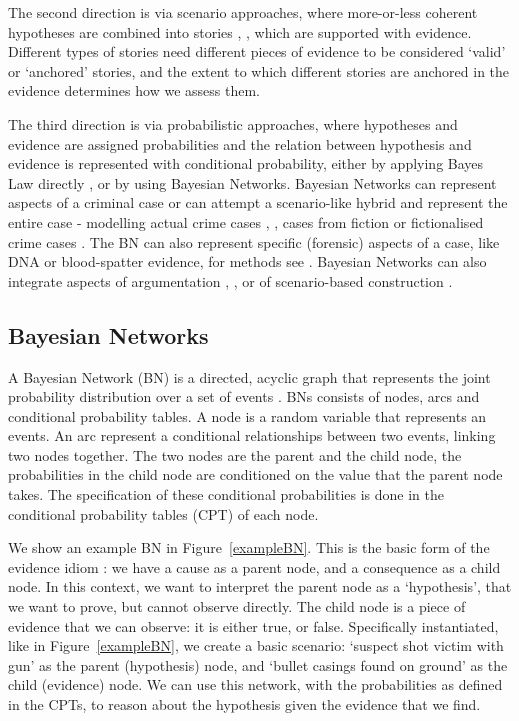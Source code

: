 \documentclass[11pt]{article}
\begin{document}
The second direction is via scenario approaches, where more-or-less coherent hypotheses are combined into stories \citep{penningtonHastie1993}, \citep{wagenaar1993}, which are supported with evidence. Different types of stories need different pieces of evidence to be considered `valid' or `anchored' stories, and the extent to which different stories are anchored in the evidence determines how we assess them. 

The third direction is via probabilistic approaches, where hypotheses and evidence are assigned probabilities and the relation between hypothesis and evidence is represented with conditional probability, either by applying Bayes Law directly \citep{dahlman2020}, or by using Bayesian Networks. Bayesian Networks can represent aspects of a criminal case or can attempt a scenario-like hybrid and represent the entire case - modelling actual crime cases \citep{kadaneSchum1996}, \citep{Fenton2019},  cases from fiction \citep{Fenton2012} or fictionalised crime cases \citep{vanLeeuwen2019}. The BN can also represent specific (forensic) aspects of a case, like DNA or blood-spatter evidence, for methods see \citep{Meester2021}. Bayesian Networks can also integrate aspects of argumentation \citep{wieten2019}, \citep{timmer2016}, or of scenario-based construction \citep{vlek2016}.



\subsection{Bayesian Networks}

A Bayesian Network (BN) is a directed, acyclic graph that represents the joint probability distribution over a set of events \citep{pearl1988b}. BNs consists of nodes, arcs and conditional probability tables. A node is a random variable that represents an events. An arc represent a conditional relationships between two events, linking two nodes together. The two nodes are the parent and the child node, the probabilities in the child node are conditioned on the value that the parent node takes. The specification of these conditional probabilities is done in the conditional probability tables (CPT) of each node.

We show an example BN in Figure~\ref{exampleBN}. This is the basic form of the evidence idiom \citep{Fenton2012}: we have a cause as a parent node, and a consequence as a child node. In this context, we want to interpret the parent node as a `hypothesis', that we want to prove, but cannot observe directly. The child node is a piece of evidence that we can observe: it is either true, or false. Specifically instantiated, like in Figure~\ref{exampleBN}, we create a basic scenario: `suspect shot victim with gun' as the parent (hypothesis) node, and `bullet casings found on ground' as the child (evidence) node. We can use this network, with the probabilities as defined in the CPTs, to reason about the hypothesis given the evidence that we find.
 
\end{document}
